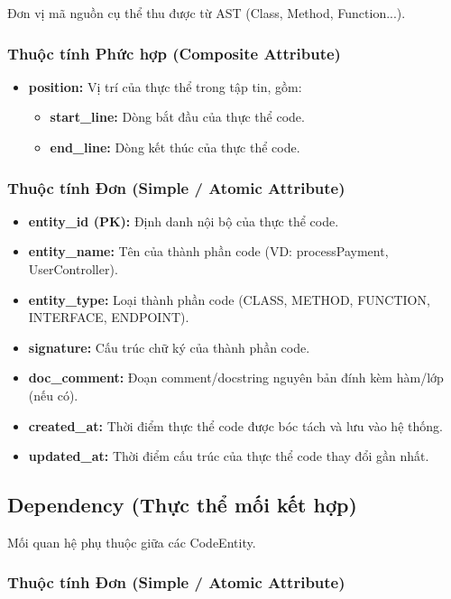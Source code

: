 Đơn vị mã nguồn cụ thể thu được từ AST (Class, Method, Function...).

\subsubsection{Thuộc tính Phức hợp (Composite Attribute)}

\begin{itemize}
    \item \textbf{position:} Vị trí của thực thể trong tập tin, gồm:
    \begin{itemize}
        \item \textbf{start\_line:} Dòng bắt đầu của thực thể code.
        \item \textbf{end\_line:} Dòng kết thúc của thực thể code.
    \end{itemize}
\end{itemize}

\subsubsection{Thuộc tính Đơn (Simple / Atomic Attribute)}

\begin{itemize}
    \item \textbf{entity\_id (PK):} Định danh nội bộ của thực thể code.
    \item \textbf{entity\_name:} Tên của thành phần code (VD: processPayment, UserController).
    \item \textbf{entity\_type:} Loại thành phần code (CLASS, METHOD, FUNCTION, INTERFACE, ENDPOINT).
    \item \textbf{signature:} Cấu trúc chữ ký của thành phần code.
    \item \textbf{doc\_comment:} Đoạn comment/docstring nguyên bản đính kèm hàm/lớp (nếu có).
    \item \textbf{created\_at:} Thời điểm thực thể code được bóc tách và lưu vào hệ thống.
    \item \textbf{updated\_at:} Thời điểm cấu trúc của thực thể code thay đổi gần nhất.
\end{itemize}


\subsection{Dependency (Thực thể mối kết hợp)}

Mối quan hệ phụ thuộc giữa các CodeEntity.

\subsubsection{Thuộc tính Đơn (Simple / Atomic Attribute)}

